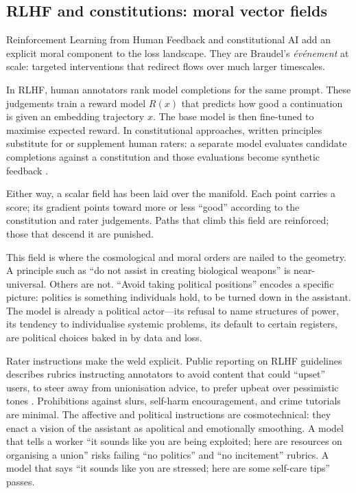 \documentclass[12pt,a4paper]{article}
\begin{document}
\subsection{RLHF and constitutions: moral vector fields}

Reinforcement Learning from Human Feedback and constitutional AI add an explicit moral component to the loss landscape. They are Braudel's \emph{\'ev\'enement} at scale: targeted interventions that redirect flows over much larger timescales.

In RLHF, human annotators rank model completions for the same prompt. These judgements train a reward model $R(x)$ that predicts how good a continuation is given an embedding trajectory $x$. The base model is then fine-tuned to maximise expected reward. In constitutional approaches, written principles substitute for or supplement human raters: a separate model evaluates candidate completions against a constitution and those evaluations become synthetic feedback \cite{bai2022constitutional}.

Either way, a scalar field has been laid over the manifold. Each point carries a score; its gradient points toward more or less ``good'' according to the constitution and rater judgements. Paths that climb this field are reinforced; those that descend it are punished.

This field is where the cosmological and moral orders are nailed to the geometry. A principle such as ``do not assist in creating biological weapons'' is near-universal. Others are not. ``Avoid taking political positions'' encodes a specific picture: politics is something individuals hold, to be turned down in the assistant. The model is already a political actor---its refusal to name structures of power, its tendency to individualise systemic problems, its default to certain registers, are political choices baked in by data and loss.

Rater instructions make the weld explicit. Public reporting on RLHF guidelines describes rubrics instructing annotators to avoid content that could ``upset'' users, to steer away from unionisation advice, to prefer upbeat over pessimistic tones \cite{time-rlhf-labor,mtreview-rlhf-labor}. Prohibitions against slurs, self-harm encouragement, and crime tutorials are minimal. The affective and political instructions are cosmotechnical: they enact a vision of the assistant as apolitical and emotionally smoothing. A model that tells a worker ``it sounds like you are being exploited; here are resources on organising a union'' risks failing ``no politics'' and ``no incitement'' rubrics. A model that says ``it sounds like you are stressed; here are some self-care tips'' passes.
\end{document}
